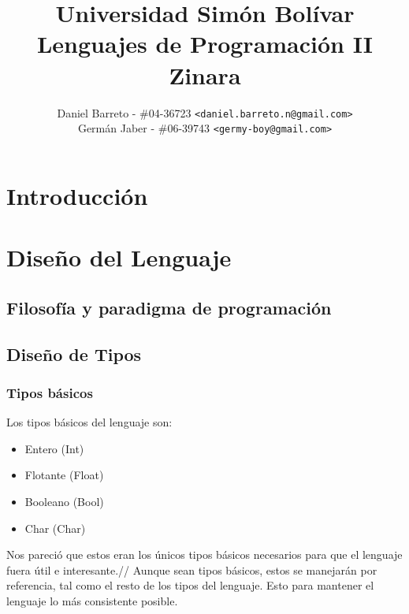 \documentclass[12pt, spanish]{report}
\begin{document}
\title{Universidad Simón Bolívar \\ Lenguajes de Programación II \\ Zinara}
\author{
  Daniel Barreto - \#04-36723 \texttt{<daniel.barreto.n@gmail.com>} \\
  Germán Jaber - \#06-39743 \texttt{<germy-boy@gmail.com>}
}
\maketitle

\tableofcontents

\newpage

\chapter{Introducción}
\label{chap:intr}



\chapter{Diseño del Lenguaje}
\label{chap:diseno}


\section{Filosofía y paradigma de programación}
\label{sec:filpar}


\section{Diseño de Tipos}
\label{sec:tipos}

\subsection{Tipos básicos}
\label{sec:tiposbasicos}
Los tipos básicos del lenguaje son:
\begin{itemize}
\item Entero   (Int)
\item Flotante (Float)
\item Booleano (Bool)
\item Char     (Char)
\end{itemize}
Nos pareció que estos eran los únicos tipos básicos necesarios
para que el lenguaje fuera útil e interesante.//
Aunque sean tipos básicos, estos se manejarán por referencia,
tal como el resto de los tipos del lenguaje. Esto para mantener
el lenguaje lo más consistente posible.
\end{document}
